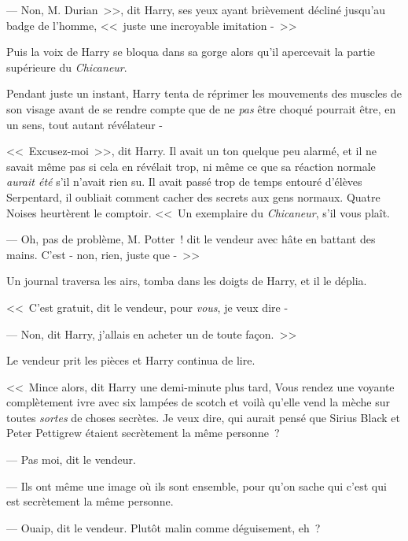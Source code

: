 --- Non, M. Durian~>>, dit Harry, ses yeux ayant brièvement décliné jusqu'au badge de l'homme, <<~juste une incroyable imitation -~>>

Puis la voix de Harry se bloqua dans sa gorge alors qu'il apercevait la partie supérieure du \emph{Chicaneur}.

Pendant juste un instant, Harry tenta de réprimer les mouvements des muscles de son visage avant de se rendre compte que de ne \emph{pas} être choqué pourrait être, en un sens, tout autant révélateur -

<<~Excusez-moi~>>, dit Harry. Il avait un ton quelque peu alarmé, et il ne savait même pas si cela en révélait trop, ni même ce que sa réaction normale \emph{aurait été} s'il n'avait rien su. Il avait passé trop de temps entouré d'élèves Serpentard, il oubliait comment cacher des secrets aux gens normaux. Quatre Noises heurtèrent le comptoir. <<~Un exemplaire du \emph{Chicaneur}, s'il vous plaît.

--- Oh, pas de problème, M. Potter~! dit le vendeur avec hâte en battant des mains. C'est - non, rien, juste que -~>>

Un journal traversa les airs, tomba dans les doigts de Harry, et il le déplia.


<<~C'est gratuit, dit le vendeur, pour \emph{vous}, je veux dire -

--- Non, dit Harry, j'allais en acheter un de toute façon.~>>

Le vendeur prit les pièces et Harry continua de lire.

<<~Mince alors, dit Harry une demi-minute plus tard, Vous rendez une voyante complètement ivre avec six lampées de scotch et voilà qu'elle vend la mèche sur toutes \emph{sortes} de choses secrètes. Je veux dire, qui aurait pensé que Sirius Black et Peter Pettigrew étaient secrètement la même personne~?

--- Pas moi, dit le vendeur.

--- Ils ont même une image où ils sont ensemble, pour qu'on sache qui c'est qui est secrètement la même personne.

--- Ouaip, dit le vendeur. Plutôt malin comme déguisement, eh~?

